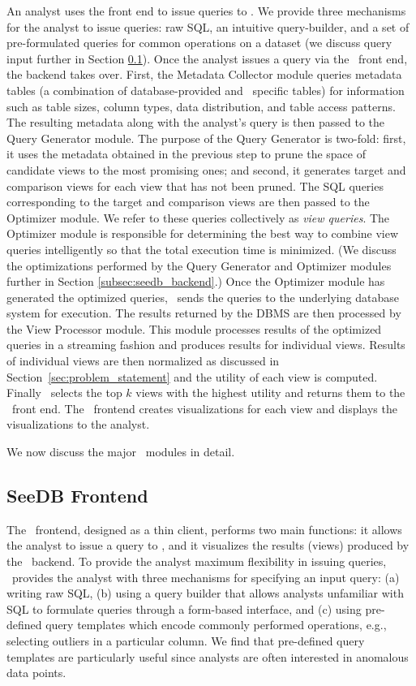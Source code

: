 An analyst uses the front end to issue queries to \SeeDB. We provide three
mechanisms for the analyst to issue queries: raw SQL, an intuitive
query-builder, and a set of pre-formulated queries for common operations on a
dataset (we discuss query input further in Section \ref{subsec:seedb_frontend}).
Once the analyst issues a query via the \SeeDB\ front end, the backend
takes over.
First, the Metadata Collector module queries metadata tables (a combination of
database-provided and \SeeDB\ specific tables) for information such as table
sizes, column types, data distribution, and table access patterns.
The resulting metadata along with the analyst's query is then passed to the
Query Generator module. The purpose of the Query Generator is two-fold:
first, it uses the metadata obtained in the previous step to prune the space of
candidate views to the most promising ones; and second, it generates target and
comparison views for each view that has not been pruned.
The SQL queries corresponding to the target and comparison views are then passed
to the Optimizer module. We refer to these queries collectively as {\it view
queries}.
The Optimizer module is responsible for determining the best way to combine
view queries intelligently so that the total execution time is
minimized. 
(We discuss the optimizations performed by the Query Generator and
Optimizer modules further in Section \ref{subsec:seedb_backend}.) Once the
Optimizer module has generated the optimized queries, \SeeDB\ sends the
queries to the underlying database system for execution. The results returned by
the DBMS are then processed by the View Processor module. This module processes
results of the optimized queries in a streaming fashion and produces results for
individual views. Results of individual views are then normalized as discussed
in Section~\ref{sec:problem_statement} and the utility of each view is computed.
Finally \SeeDB\ selects the top $k$ views with the highest utility and returns them to the
\SeeDB\ front end. The \SeeDB\ frontend creates visualizations for each
view and displays the visualizations to the analyst.

We now discuss the major \SeeDB\ modules in detail.

\subsection{SeeDB Frontend}
\label{subsec:seedb_frontend}

The \SeeDB\ frontend, designed as a thin client, performs two main functions: it
allows the analyst to issue a query to \SeeDB, and it visualizes the results (views) produced by the \SeeDB\
backend.
To provide the analyst maximum flexibility in issuing queries, \SeeDB\
provides the analyst with three
mechanisms for specifying an input query: 
(a) writing raw SQL, (b) using a query builder that allows analysts
unfamiliar with SQL to formulate queries through a form-based interface, and (c)
using pre-defined query templates which encode commonly performed operations,
e.g., selecting outliers in a particular column. We find that pre-defined query
templates are particularly useful since analysts are often interested in
anomalous data points.

